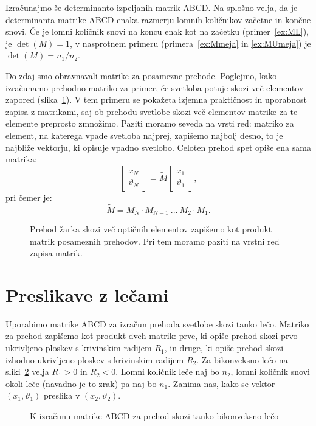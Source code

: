 Izračunajmo še determinanto izpeljanih matrik ABCD. Na splošno velja, da
je determinanta matrike ABCD enaka razmerju lomnih količnikov začetne in 
končne snovi. Če je lomni količnik snovi na koncu enak
kot na začetku (primer~\ref{ex:ML}), je $\det(M) = 1$, v nasprotnem primeru 
(primera~\ref{ex:Mmeja} in \ref{ex:MUmeja}) je $\det(M) = n_1/n_2$.

Do zdaj smo obravnavali matrike za posamezne prehode. Poglejmo, kako izračunamo
prehodno matriko za primer, če svetloba potuje skozi več elementov zapored (slika~\ref{fig:01_MMM}). V tem
primeru se pokažeta izjemna praktičnost in uporabnost zapisa z matrikami, saj ob prehodu svetlobe skozi 
več elementov matrike za te elemente preprosto zmnožimo. Paziti moramo seveda
na vrsti red: matriko za element, na katerega vpade svetloba najprej, zapišemo
najbolj desno, to je najbliže vektorju, ki opisuje vpadno svetlobo. Celoten prehod
spet opiše ena sama matrika:
\begin{equation}
\left[\begin{array}{c}
x_N\\
\vartheta_N
\end{array}\right] 
= \tilde{M} \left[\begin{array}{c}
x_1\\
\vartheta_1
\end{array}\right]\!\!,
 \label{eq:02_45}
\end{equation}
pri čemer je:
\begin{equation}
\tilde{M} = M_N \cdot M_{N-1}~...~M_2 \cdot M_1.
 \label{eq:02_46}
\end{equation}
\begin{figure}[ht]
\centering
\def\svgwidth{100truemm} 

\caption{Prehod žarka skozi več optičnih elementov zapišemo kot produkt matrik posameznih prehodov.
Pri tem moramo paziti na vrstni red zapisa matrik.}
\label{fig:01_MMM}
\end{figure}

\section{Preslikave z lečami}
\label{chap:lecje}
Uporabimo matrike ABCD za izračun prehoda svetlobe skozi tanko lečo. Matriko
za prehod zapišemo kot produkt dveh matrik: prve, ki opiše
prehod skozi prvo ukrivljeno ploskev s krivinskim radijem $R_1$, 
in druge, ki opiše prehod skozi izhodno ukrivljeno ploskev s 
krivinskim radijem $R_2$. Za bikonveksno lečo na sliki~\ref{fig:02_tankaleca} velja 
$R_1>0$ in $R_2<0$.
Lomni količnik leče naj bo $n_2$, lomni količnik snovi okoli leče 
(navadno je to zrak) pa naj bo $n_1$. Zanima nas, kako se vektor $(x_1, \vartheta_1)$ 
preslika v $(x_2, \vartheta_2)$.
\begin{figure}[!h]
\centering
\def\svgwidth{100truemm} 

\caption{K izračunu matrike ABCD za prehod skozi tanko bikonveksno lečo}
\label{fig:02_tankaleca}
\end{figure}

